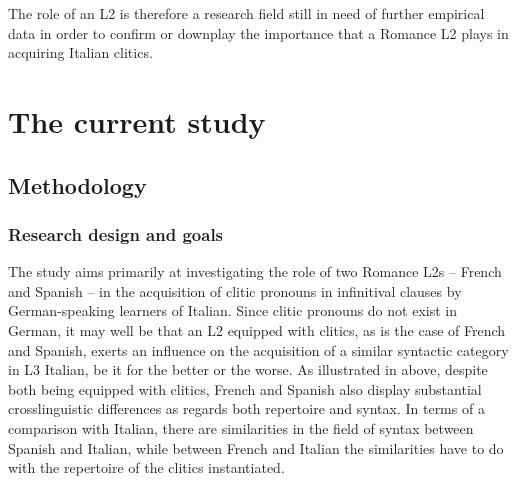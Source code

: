\documentclass[output=paper,modfonts,nonflat,newtxmath]{langsci/langscibook}
\begin{document}
\z

\z

The role of an L2 is therefore a research field still in need of further empirical data in order to confirm or downplay the importance that a Romance L2 plays in acquiring Italian clitics.

\section {The {current} study} %
\label{sec:sciutti:4}

\subsection{Methodology}%
\label{sec:sciutti:4.1}

\subsubsection{Research {design} {and} goals} %

The study aims primarily at investigating the role of two Romance L2s – French and Spanish – in the acquisition of clitic pronouns in infinitival clauses by German-speaking learners of Italian. Since clitic pronouns do not exist in German, it may well be that an L2 equipped with clitics, as is the case of French and Spanish, exerts an influence on the acquisition of a similar syntactic category in L3 Italian, be it for the better or the worse. As illustrated in  above, despite both being equipped with clitics, French and Spanish also display substantial crosslinguistic differences as regards both repertoire and syntax. In terms of a comparison with Italian, there are similarities in the field of syntax between Spanish and Italian, while between French and Italian the similarities have to do with the repertoire of the clitics instantiated.
\end{document}
